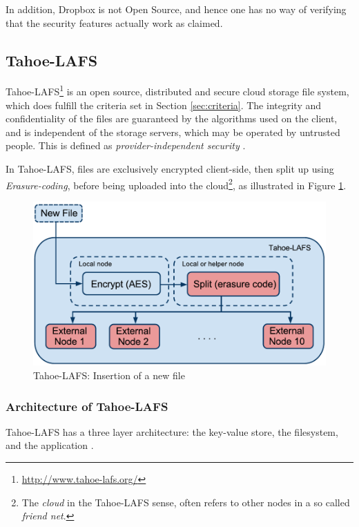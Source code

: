 \documentclass[pdftex,english,10pt,b5paper,twoside]{book}
\begin{document}
In addition, Dropbox is not Open Source, and hence one has no way of verifying
that the security features actually work as claimed.

\subsection{Tahoe-LAFS}

Tahoe-\ac{LAFS}\footnote{\url{http://www.tahoe-lafs.org/}} is an open source,
distributed and secure cloud storage file system, which does fulfill
the criteria set in Section \ref{sec:criteria}.
The integrity and confidentiality of the
files are guaranteed by the algorithms used on the client, and is independent
of the storage servers, which may be operated by untrusted people.
This is defined as \emph{provider-independent security} \cite{tahoe}.

In Tahoe-\ac{LAFS}, files are exclusively encrypted client-side, then split up
using \emph{Erasure-coding}, before being uploaded into the cloud\footnote{The
\emph{cloud} in the Tahoe-\ac{LAFS} sense, often refers to other nodes in a so
called \emph{friend net}.}, as illustrated in Figure \ref{fig:B:tahoe}.

\begin{figure}[h!]
    \centering
    \includegraphics[width=\columnwidth]{Tahoe-newfile.pdf}
    \caption{Tahoe-LAFS: Insertion of a new file}
    \label{fig:B:tahoe}
\end{figure}


\subsubsection{Architecture of Tahoe-LAFS}

Tahoe-\ac{LAFS} has a three layer architecture: the key-value store, the filesystem, and
the application \cite{tahoe}.
\end{document}
